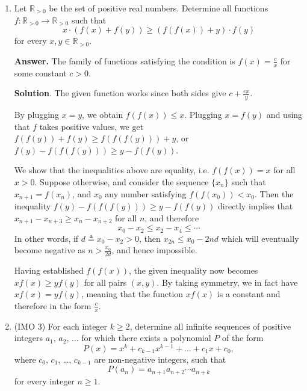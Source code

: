 \documentclass[11pt,a4paper]{article}
\begin{document}
\begin{enumerate}
		Therefore, if 
		$a_{n+1} - a_n = a_{n+2}-a_{n+1}=1$ for some $n$, 
		then 
		\[x_{n+1} = \sqrt{\frac{S_n}{T_n}}
		\qquad 
		x_{n+2} = \sqrt{\frac{S_{n+1}}{T_{n+1}}}
		= \sqrt{\frac{S_n + x_{n+1}}{T_n + \frac{1}{x_{n+1}}}}
		=\sqrt{\frac{S_n + \sqrt{S_n/T_n}}{T_n + \sqrt{T_n/S_n}}}
		=\sqrt{\frac{S_n}{T_n}}\]
		I.e. $x_{n+1}=x_{n+2}$. 
		This contradicts that $x_n$'s are pairwise distinct. 
		
		\item [A4.]
		Let $\mathbb R_{>0}$ be the set of positive real numbers. Determine all functions $f \colon \mathbb R_{>0} \to \mathbb R_{>0}$ such that\[x \cdot \left(f(x) + f(y)\right) \geq \left(f(f(x)) + y\right) \cdot f(y)\]for every $x, y \in \mathbb R_{>0}$.
		
		\textbf{Answer.} 
		The family of functions satisfying the condition is $f(x) = \frac{c}{x}$ for some constant $c > 0$. 
		
		\textbf{Solution}. 
		The given function works since both sides give 
		$c + \frac{cx}{y}$. 
		
		By plugging $x=y$, we obtain $f(f(x))\le x$. 
		Plugging $x = f(y)$ and using that $f$ takes positive values, 
		we get $f(f(y)) + f(y)\ge f(f(f(y))) + y$, 
		or $f(y) - f(f(f(y))) \ge y - f(f(y))$. 
		
		We show that the inequalities above are equality, i.e. 
		$f(f(x)) = x$ for all $x > 0$. 
		Suppose otherwise, and consider the sequence $\{x_n\}$ such that $x_{n+1} = f(x_n)$, 
		and $x_0$ any number satisfying $f(f(x_0)) < x_0$. 
		Then the inequality $f(y) - f(f(f(y))) \ge y - f(f(y))$ directly implies that 
		$x_{n+1} - x_{n+3} \ge x_n - x_{n+2}$ for all $n$, and therefore 
		\[
		x_0 - x_2 \le x_2 - x_4\le\cdots
		\]
		In other words, if $d\triangleq x_0-x_2 > 0$, 
		then $x_{2n}\le x_0 - 2nd$ which will eventually become negative as $n > \frac{x_0}{2d}$, and hence impossible. 
		
		Having established $f(f(x))$, 
		the given inequality now becomes $xf(x) \ge yf(y)$ for all pairs $(x, y)$. 
		By taking symmetry, we in fact have $xf(x) = yf(y)$, 
		meaning that the function $xf(x)$ is a constant and therefore in the form $\frac{c}{x}$. 
		
		\item [A6.] (IMO 3)
		For each integer $k\geq 2$, determine all infinite sequences of positive integers $a_1$, $a_2$, $\ldots$ for which there exists a polynomial $P$ of the form\[ P(x)=x^k+c_{k-1}x^{k-1}+\dots + c_1 x+c_0, \]where $c_0$, $c_1$, \dots, $c_{k-1}$ are non-negative integers, such that\[ P(a_n)=a_{n+1}a_{n+2}\cdots a_{n+k} \]for every integer $n\geq 1$.
		

\end{enumerate}
\end{document}
